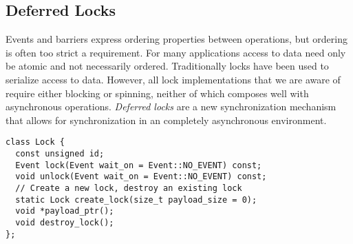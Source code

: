 \subsection{Deferred Locks}
\label{subsec:locks}

Events and barriers express ordering properties between operations, but 
ordering is often too strict a requirement.  For many applications access to data need only be atomic and
not necessarily ordered.  Traditionally locks have been used to serialize access to
data.  However, all lock implementations that we are aware of require either blocking
or spinning, neither of which composes well with asynchronous operations.
{\em Deferred locks} are a new synchronization mechanism that allows for synchronization
in an completely asynchronous environment.  

\begin{lstlisting}[float={t},label={lst:lockapi},caption={Deferred Lock Interface.}]
class Lock {
  const unsigned id;
  Event lock(Event wait_on = Event::NO_EVENT) const;
  void unlock(Event wait_on = Event::NO_EVENT) const;
  // Create a new lock, destroy an existing lock
  static Lock create_lock(size_t payload_size = 0);
  void *payload_ptr();
  void destroy_lock();
};
\end{lstlisting}

